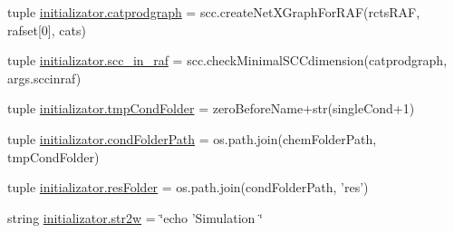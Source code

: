 \begin{DoxyCompactItemize}
$$\item 
tuple \hyperlink{a00137_ae879083e010a0e2af0a12a7d953a6e8b}{initializator.\+catprodgraph} = scc.\+create\+Net\+X\+Graph\+For\+R\+A\+F(rcts\+R\+A\+F, rafset\mbox{[}0\mbox{]}, cats)
\item 
tuple \hyperlink{a00137_a528fd8494c795cfcb3810626c84ae291}{initializator.\+scc\+\_\+in\+\_\+raf} = scc.\+check\+Minimal\+S\+C\+Cdimension(catprodgraph, args.\+sccinraf)
\item 
tuple \hyperlink{a00137_ad43d43e724c966749db268c9b523a02c}{initializator.\+tmp\+Cond\+Folder} = zero\+Before\+Name+str(single\+Cond+1)
\item 
tuple \hyperlink{a00137_a7fe46587523066ae019cbe755f63888a}{initializator.\+cond\+Folder\+Path} = os.\+path.\+join(chem\+Folder\+Path, tmp\+Cond\+Folder)
\item 
tuple \hyperlink{a00137_ae3ceb468287bbef82c0134b3eeea4419}{initializator.\+res\+Folder} = os.\+path.\+join(cond\+Folder\+Path, 'res')
\item 
string \hyperlink{a00137_ae18cfdf290fd3edf979ab55e9dbb65c7}{initializator.\+str2w} = \char`\"{}echo 'Simulation \char`\"{}
\end{DoxyCompactItemize}
